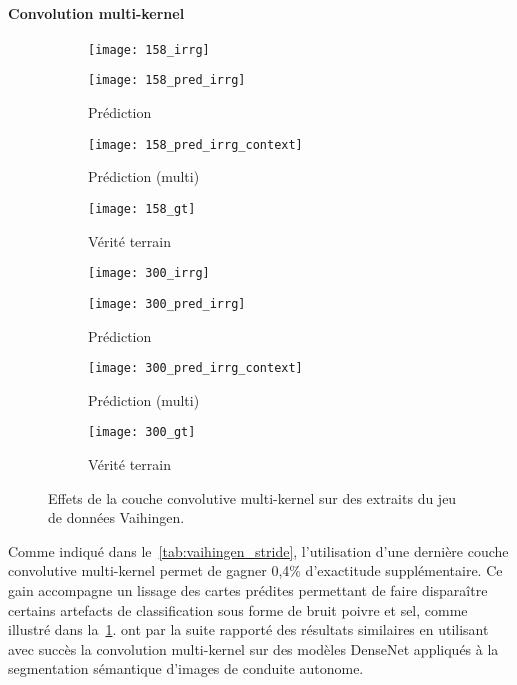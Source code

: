 \paragraph{Convolution multi-kernel}
\begin{figure}[h]
  \captionsetup[subfigure]{singlelinecheck=off,justification=centering}
  \captionsetup[subfigure]{labelformat=empty}
  \begin{subfigure}[t]{0.125\textwidth}
    \texttt{[image: 158\_irrg]}
    \caption{}
  \end{subfigure}%
  \begin{subfigure}[t]{0.125\textwidth}
    \texttt{[image: 158\_pred\_irrg]}
    \caption{Prédiction}
  \end{subfigure}%
  \begin{subfigure}[t]{0.125\textwidth}
    \texttt{[image: 158\_pred\_irrg\_context]}
    \caption{Prédiction (multi)}
  \end{subfigure}%
  \begin{subfigure}[t]{0.125\textwidth}
    \texttt{[image: 158\_gt]}
    \caption{Vérité terrain}
  \end{subfigure}%
	\begin{subfigure}[t]{0.125\textwidth}
		\texttt{[image: 300\_irrg]}
		\caption{}
	\end{subfigure}%
	\begin{subfigure}[t]{0.125\textwidth}
		\texttt{[image: 300\_pred\_irrg]}
		\caption{Prédiction}
	\end{subfigure}%
	\begin{subfigure}[t]{0.125\textwidth}
		\texttt{[image: 300\_pred\_irrg\_context]}
		\caption{Prédiction (multi)}
	\end{subfigure}%
	\begin{subfigure}[t]{0.125\textwidth}
		\texttt{[image: 300\_gt]}
		\caption{Vérité terrain}
	\end{subfigure}
  \caption[Effets de la couche convolutive multi-kernel sur des extraits du jeu de données  Vaihingen.]{Effets de la couche convolutive multi-kernel sur des extraits du jeu de données  Vaihingen.\\
	\isprslegende}
  \label{fig:patches_context}
\end{figure}

Comme indiqué dans le~\cref{tab:vaihingen_stride}, l'utilisation d'une dernière couche convolutive multi-kernel permet de gagner 0,4\% d'exactitude supplémentaire. Ce gain accompagne un lissage des cartes prédites permettant de faire disparaître certains artefacts de classification sous forme de bruit poivre et sel, comme illustré dans la~\cref{fig:patches_context}.
\citet{brahimi_multiscale_2018} ont par la suite rapporté des résultats similaires en utilisant avec succès la convolution multi-kernel sur des modèles DenseNet appliqués à la segmentation sémantique d'images de conduite autonome.


